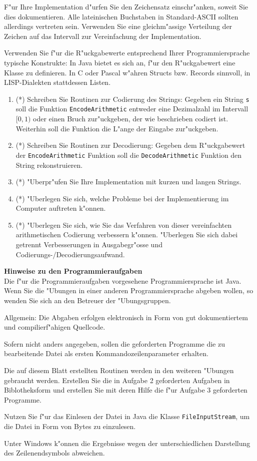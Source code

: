 \documentclass[a4paper]{article}
\begin{document}
\bigskip

F"ur Ihre Implementation d"urfen Sie den Zeichensatz einschr"anken, soweit
Sie dies dokumentieren. Alle lateinischen Buchstaben in Standard-ASCII
sollten allerdings vertreten sein. Verwenden Sie eine gleichm"assige
Verteilung der Zeichen auf das Intervall zur Vereinfachung der Implementation.

Verwenden Sie f"ur die R"uckgabewerte entsprechend Ihrer Programmiersprache
typische Konstrukte: In Java bietet es sich an, f"ur den R"uckgabewert eine
Klasse zu definieren. In C oder Pascal w"ahren Structs bzw. Records sinnvoll,
in LISP-Dialekten stattdessen Listen.

\begin{enumerate}
\item (*) Schreiben Sie Routinen zur Codierung des Strings: Gegeben ein String
      \verb$s$ soll die Funktion \verb$EncodeArithmetic$ entweder eine
      Dezimalzahl im Intervall $[0,1)$ oder einen Bruch zur"uckgeben, der wie
      beschrieben codiert ist. Weiterhin soll die Funktion die L"ange der
      Eingabe zur"uckgeben.
\item (*) Schreiben Sie Routinen zur Decodierung: Gegeben dem R"uckgabewert der
      \verb$EncodeArithmetic$ Funktion soll die \verb$DecodeArithmetic$ Funktion
      den String rekonstruieren.
\item (*) "Uberpr"ufen Sie Ihre Implementation mit kurzen und langen Strings.
\item (*) "Uberlegen Sie sich, welche Probleme bei der Implementierung im
      Computer auftreten k"onnen.
\item (*) "Uberlegen Sie sich, wie Sie das Verfahren von dieser vereinfachten
      arithmetischen Codierung verbessern k"onnen. "Uberlegen Sie sich dabei
      getrennt Verbesserungen in Ausgabegr"osse und
      Codierungs-/Decodierungsaufwand.
\end{enumerate}

\bigskip

{\bf Hinweise zu den Programmieraufgaben}\\
Die f"ur die Programmieraufgaben vorgesehene Programmiersprache ist Java. Wenn Sie die "Ubungen in einer anderen Programmiersprache abgeben wollen, so wenden Sie sich an den Betreuer der "Ubungsgruppen.

Allgemein: Die Abgaben erfolgen elektronisch in Form von gut dokumentiertem und compilierf"ahigen Quellcode.

Sofern nicht anders angegeben, sollen die geforderten Programme die zu bearbeitende Datei als ersten Kommandozeilenparameter erhalten.

Die auf diesem Blatt erstellten Routinen werden in den weiteren "Ubungen gebraucht werden. Erstellen Sie die in Aufgabe 2 geforderten Aufgaben in Biblotheksform und erstellen Sie mit deren Hilfe die f"ur Aufgabe 3 geforderten Programme.

Nutzen Sie f"ur das Einlesen der Datei in Java die Klasse \verb$FileInputStream$, um die Datei in Form von Bytes zu einzulesen.

Unter Windows k"onnen die Ergebnisse wegen der unterschiedlichen Darstellung des Zeilenendsymbols abweichen.
\end{document}
